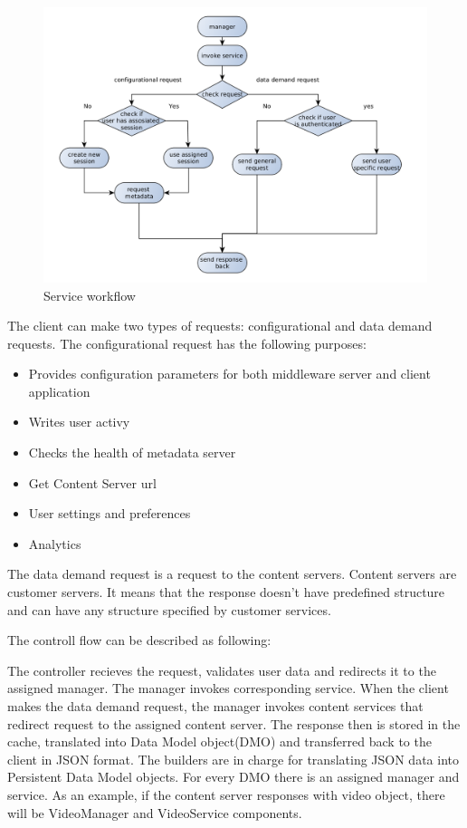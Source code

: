 \begin{figure}[h]
    \centering
	\includegraphics[width=\textwidth]{images/via_service_1.png}
    \caption{Service workflow}
    \label{fig:via_service}
\end{figure}


The client can make two types of requests: configurational and data demand requests.
The configurational request has the following purposes:
\begin{itemize}
	\item Provides configuration parameters for both middleware server and client application
	\item Writes user activy
	\item Checks the health of metadata server
	\item Get Content Server url
	\item User settings and preferences
	\item Analytics
\end{itemize}


The data demand request is a request to the content servers. Content servers are customer servers. It means that the response doesn't have predefined structure and can have any structure specified by customer services. 

The controll flow can be described as following:

The controller recieves the request, validates user data and redirects it to the assigned manager. The manager  invokes corresponding service. When the client makes the data demand request, the manager invokes content services that redirect request to the assigned content server. The response then is stored in the cache, translated into Data Model object(DMO) and transferred back to the client in JSON format. The builders are in charge for translating JSON data into Persistent Data Model objects. For every DMO there is an assigned manager and service. As an example, if the content server responses with video object, there will be VideoManager and VideoService components.   

